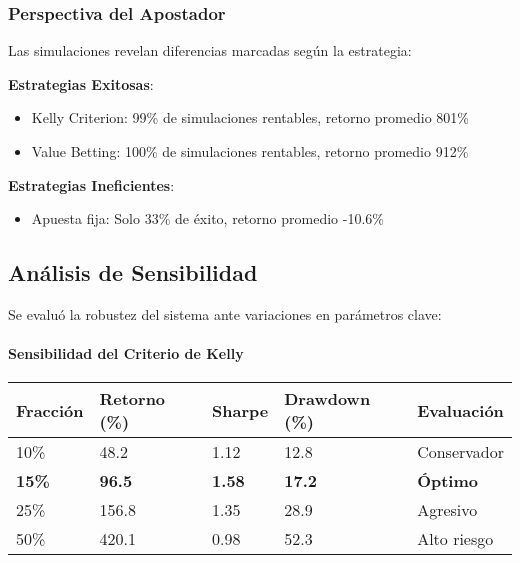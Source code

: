 \documentclass{article}
\begin{document}
\subsubsection{Perspectiva del Apostador}

Las simulaciones revelan diferencias marcadas según la estrategia:

\textbf{Estrategias Exitosas}:
\begin{itemize}
    \item Kelly Criterion: 99\% de simulaciones rentables, retorno promedio 801\%
    \item Value Betting: 100\% de simulaciones rentables, retorno promedio 912\%
\end{itemize}

\textbf{Estrategias Ineficientes}:
\begin{itemize}
    \item Apuesta fija: Solo 33\% de éxito, retorno promedio -10.6\%
\end{itemize}

\subsection{Análisis de Sensibilidad}

Se evaluó la robustez del sistema ante variaciones en parámetros clave:

\paragraph{Sensibilidad del Criterio de Kelly}
\begin{longtable}{|p{2.5cm}|p{2cm}|p{2cm}|p{2cm}|p{2.5cm}|}
\hline
\textbf{Fracción} & \textbf{Retorno (\%)} & \textbf{Sharpe} & \textbf{Drawdown (\%)} & \textbf{Evaluación} \\
\hline
\endhead
10\% & 48.2 & 1.12 & 12.8 & Conservador \\
\hline
\textcolor{primary}{\textbf{15\%}} & \textcolor{primary}{\textbf{96.5}} & \textcolor{primary}{\textbf{1.58}} & \textcolor{primary}{\textbf{17.2}} & \textcolor{primary}{\textbf{Óptimo}} \\
\hline
25\% & 156.8 & 1.35 & 28.9 & Agresivo \\
\hline
50\% & 420.1 & 0.98 & 52.3 & Alto riesgo \\
\hline
\end{longtable}
\end{document}
